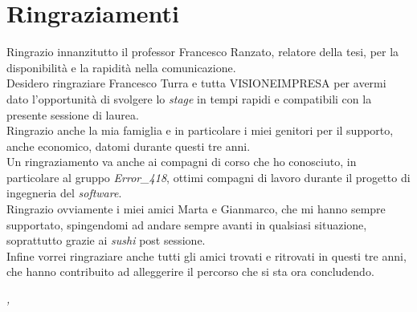 \cleardoublepage
{}
{}

\bigskip

\begingroup
\let\clearpage\relax
\let\cleardoublepage\relax
\let\cleardoublepage\relax

\chapter*{Ringraziamenti}

Ringrazio innanzitutto il professor Francesco Ranzato, relatore della tesi, per la disponibilità e la rapidità nella comunicazione.\\

\noindent Desidero ringraziare Francesco Turra e tutta VISIONEIMPRESA per avermi dato l'opportunità di svolgere lo \textit{stage} in tempi rapidi e compatibili con la presente sessione di laurea.\\

\noindent Ringrazio anche la mia famiglia e in particolare i miei genitori per il supporto, anche economico, datomi durante questi tre anni.\\

\noindent Un ringraziamento va anche ai compagni di corso che ho conosciuto, in particolare al gruppo \textit{Error\_418}, ottimi compagni di lavoro durante il progetto di ingegneria del \textit{software}.\\

\noindent Ringrazio ovviamente i miei amici Marta e Gianmarco, che mi hanno sempre supportato, spingendomi ad andare sempre avanti in qualsiasi situazione, soprattutto grazie ai \textit{sushi} post sessione.\\

\noindent Infine vorrei ringraziare anche tutti gli amici trovati e ritrovati in questi tre anni, che hanno contribuito ad alleggerire il percorso che si sta ora concludendo.\\

\bigskip

\noindent\textit{\myLocation, \myTime}
\hfill \myName

\endgroup

